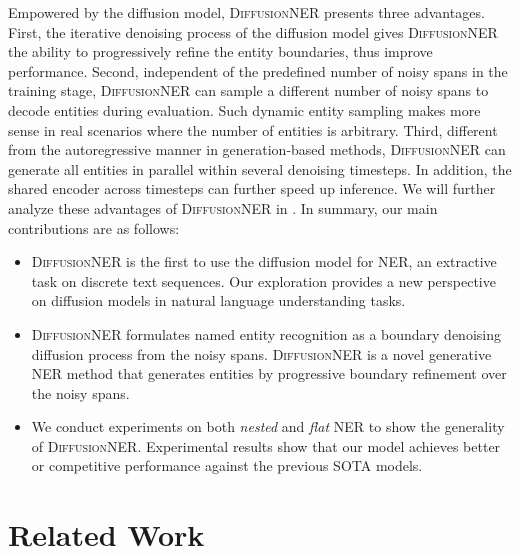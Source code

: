 \documentclass[11pt]{article}
\begin{document}
Empowered by the diffusion model, \textsc{DiffusionNER} presents three advantages. 
First, the iterative denoising process of the diffusion model gives \textsc{DiffusionNER} the ability to progressively refine the entity boundaries, thus improve performance. 
Second, independent of the predefined number of noisy spans in the training stage, \textsc{DiffusionNER} can sample a different number of noisy spans to decode entities during evaluation. Such dynamic entity sampling makes more sense in real scenarios where the number of entities is arbitrary. Third, different from the autoregressive manner in generation-based methods, \textsc{DiffusionNER} can generate all entities in parallel within several denoising timesteps. 
In addition, the shared encoder across timesteps can further speed up inference. 
We will further analyze these advantages of \textsc{DiffusionNER} in . In summary, our main contributions are as follows:

\begin{itemize}
    \item \textsc{DiffusionNER} is the first to use the diffusion model for NER, an extractive task on discrete text sequences. Our exploration provides a new perspective on diffusion models in natural language understanding tasks.
    \item \textsc{DiffusionNER} formulates named entity recognition as a boundary denoising diffusion process from the noisy spans. \textsc{DiffusionNER} is a novel generative NER method that generates entities by progressive boundary refinement over the noisy spans.
\item We conduct experiments on both \textit{nested} and \textit{flat} NER to show the generality of \textsc{DiffusionNER}. Experimental results show that our model achieves better or competitive performance against the previous SOTA models.
\end{itemize}


\section{Related Work}
\end{document}
